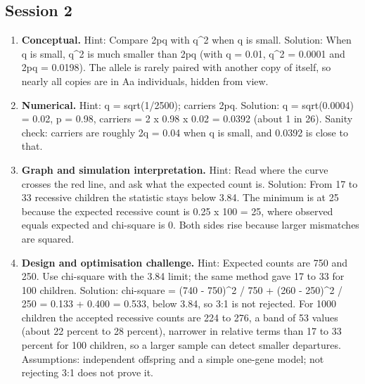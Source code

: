 \documentclass[11pt,a4paper]{article}
\begin{document}
\subsection*{Session 2}
\begin{enumerate}[nosep]
\item \textbf{Conceptual.} Hint: Compare 2pq with q\textasciicircum{}2 when q is small. Solution: When q is small, q\textasciicircum{}2 is much smaller than 2pq (with q = 0.01, q\textasciicircum{}2 = 0.0001 and 2pq = 0.0198). The allele is rarely paired with another copy of itself, so nearly all copies are in Aa individuals, hidden from view.
\item \textbf{Numerical.} Hint: q = sqrt(1/2500); carriers 2pq. Solution: q = sqrt(0.0004) = 0.02, p = 0.98, carriers = 2 x 0.98 x 0.02 = 0.0392 (about 1 in 26). Sanity check: carriers are roughly 2q = 0.04 when q is small, and 0.0392 is close to that.
\item \textbf{Graph and simulation interpretation.} Hint: Read where the curve crosses the red line, and ask what the expected count is. Solution: From 17 to 33 recessive children the statistic stays below 3.84. The minimum is at 25 because the expected recessive count is 0.25 x 100 = 25, where observed equals expected and chi-square is 0. Both sides rise because larger mismatches are squared.
\item \textbf{Design and optimisation challenge.} Hint: Expected counts are 750 and 250. Use chi-square with the 3.84 limit; the same method gave 17 to 33 for 100 children. Solution: chi-square = (740 - 750)\textasciicircum{}2 / 750 + (260 - 250)\textasciicircum{}2 / 250 = 0.133 + 0.400 = 0.533, below 3.84, so 3:1 is not rejected. For 1000 children the accepted recessive counts are 224 to 276, a band of 53 values (about 22 percent to 28 percent), narrower in relative terms than 17 to 33 percent for 100 children, so a larger sample can detect smaller departures. Assumptions: independent offspring and a simple one-gene model; not rejecting 3:1 does not prove it.
\end{enumerate}
\end{document}
